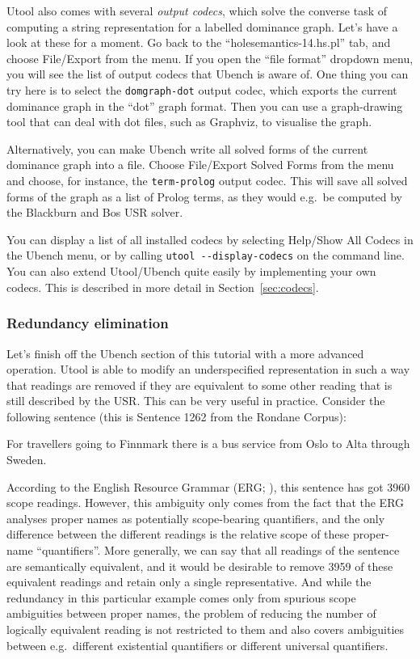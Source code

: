 Utool also comes with several \emph{output codecs}, which solve the converse task of computing a string representation for a labelled dominance graph. Let's have a look at these for a moment. Go back to the ``holesemantics-14.hs.pl'' tab, and choose File/Export from the menu. If you open the ``file format'' dropdown menu, you will see the list of output codecs that Ubench is aware of. One thing you can try here is to select the \verb?domgraph-dot? output codec, which exports the current dominance graph in the ``dot'' graph format. Then you can use a graph-drawing tool that can deal with dot files, such as Graphviz, to visualise the graph.

Alternatively, you can make Ubench write all solved forms of the current dominance graph into a file. Choose File/Export Solved Forms from the menu and choose, for instance, the \verb?term-prolog? output codec. This will save all solved forms of the graph as a list of Prolog terms, as they would e.g.\ be computed by the Blackburn and Bos USR solver.

You can display a list of all installed codecs by selecting Help/Show All Codecs in the Ubench menu, or by calling \verb?utool --display-codecs? on the command line. You can also extend Utool/Ubench quite easily by implementing your own codecs. This is described in more detail in Section~\ref{sec:codecs}.



\subsubsection{Redundancy elimination}

Let's finish off the Ubench section of this tutorial with a more advanced operation. Utool is able to modify an underspecified representation in such a way that readings are removed if they are equivalent to some other reading that is still described by the USR. This can be very useful in practice. Consider the following sentence (this is Sentence 1262 from the Rondane Corpus):

\begin{example}
\label{ex:rondane-1262} 
  For travellers going to Finnmark there is a bus service from Oslo to
  Alta through Sweden. 
\end{example}

According to the English Resource Grammar (ERG; ), this sentence has got 3960 scope readings. However, this ambiguity only comes from the fact that the ERG analyses proper names as potentially scope-bearing quantifiers, and the only difference between the different readings is the relative scope of these proper-name ``quantifiers''. More generally, we can say that all readings of the sentence are semantically equivalent, and it would be desirable to remove 3959 of these equivalent readings and retain only a single representative. And while the redundancy in this particular example comes only from spurious scope ambiguities between proper names, the problem of reducing the number of logically equivalent reading is not restricted to them and also covers ambiguities between e.g.\ different existential quantifiers or different universal quantifiers.

